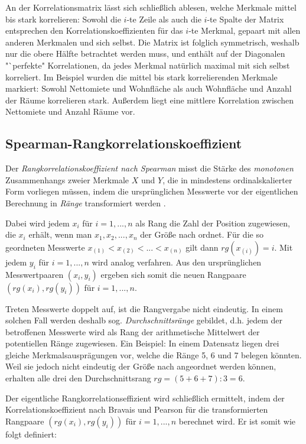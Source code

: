 \noindent An der Korrelationsmatrix lässt sich schließlich ablesen, welche Merkmale mittel bis stark korrelieren: Sowohl die $i$-te Zeile als auch die $i$-te Spalte der Matrix  entsprechen den Korrelationskoeffizienten für das $i$-te Merkmal, gepaart mit allen anderen Merkmalen und sich selbst. Die Matrix ist folglich symmetrisch, weshalb nur die obere Hälfte betrachtet werden muss, und enthält auf der Diagonalen "`perfekte" Korrelationen, da jedes Merkmal natürlich maximal mit sich selbst korreliert. Im Beispiel wurden die mittel bis stark korrelierenden Merkmale markiert: Sowohl Nettomiete und Wohnfläche als auch Wohnfläche und Anzahl der Räume korrelieren stark. Außerdem liegt eine mittlere Korrelation zwischen Nettomiete und Anzahl Räume vor.

\subsection{Spearman-Rangkorrelationskoeffizient}
\label{sec:spear_rangkorr}

Der {\it Rangkorrelationskoeffizient nach Spearman} misst die Stärke des {\it monotonen} Zusammenhangs zweier Merkmale $X$ und $Y$, die in mindestens ordinalskalierter Form vorliegen müssen, indem die ursprünglichen Messwerte vor der eigentlichen Berechnung in {\it Ränge} transformiert werden \cite[S. 142]{Fahrmeir2010}.

Dabei wird jedem $x_i$ für $i=1,...,n$ als Rang die Zahl der Position zugewiesen, die $x_i$ erhält, wenn man $x_1, x_2, ..., x_n$ der Größe nach ordnet. Für die so geordneten Messwerte $x_{(1)}<x_{(2)}<...<x_{(n)}$ gilt dann $rg(x_{(i)})=i$. Mit jedem $y_i$ für $i=1,...,n$ wird analog verfahren. Aus den ursprünglichen Messwertpaaren $(x_i, y_i)$ ergeben sich somit die neuen Rangpaare $(rg(x_i), rg(y_i))$ für $i=1,...,n$.

Treten Messwerte doppelt auf, ist die Rangvergabe nicht eindeutig. In einem solchen Fall werden deshalb sog. {\it Durchschnittsränge} gebildet, d.h. jedem der betroffenen Messwerte wird als Rang der arithmetische Mittelwert der potentiellen Ränge zugewiesen. Ein Beispiel: In einem Datensatz liegen drei gleiche Merkmalsausprägungen vor, welche die Ränge 5, 6 und 7 belegen könnten. Weil sie jedoch nicht eindeutig der Größe nach angeordnet werden können, erhalten alle drei den Durchschnittsrang $rg=(5+6+7):3=6$.

Der eigentliche Rangkorrelationseffizient wird schließlich ermittelt, indem der Korrelationskoeffizient nach Bravais und Pearson für die transformierten Rangpaare $(rg(x_i), rg(y_i))$ für $i=1,...,n$ berechnet wird. Er ist somit wie folgt definiert:

